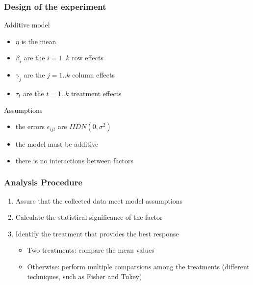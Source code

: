 \documentclass{beamer}
\begin{document}
\begin{frame}
\frametitle{Design of the experiment}
\begin{block}{Additive model}
\begin{scriptsize}
\begin{itemize}
  \item $\eta$ is the mean
  \item $\beta_i$ are the $i = 1 .. k$ row effects
  \item $\gamma_j$ are the $j = 1 .. k$ column effects
  \item $\tau_t$ are the $t = 1 .. k$ treatment effects
\end{itemize}
\end{scriptsize}
\end{block}

\begin{block}{Assumptions}
\begin{itemize}
  \item the errors $\epsilon_{ijt}$ are $IIDN(0,\sigma^2)$
  \item the model must be additive
  \item there is no interactions between factors
\end{itemize}
\end{block}

\end{frame}

\begin{frame}
\frametitle{Analysis Procedure}
\begin{enumerate}
  \item Assure that the collected data meet model assumptions
  \item Calculate the statistical significance of the factor 
  \item Identify the treatment that provides the best response
  \begin{itemize}
    \item Two treatments: compare the mean values
    \item Otherwise: perform multiple comparsions among the treatments
    (different techniques, such as Fisher and Tukey)
  \end{itemize}
\end{enumerate}
\end{frame}
\end{document}
